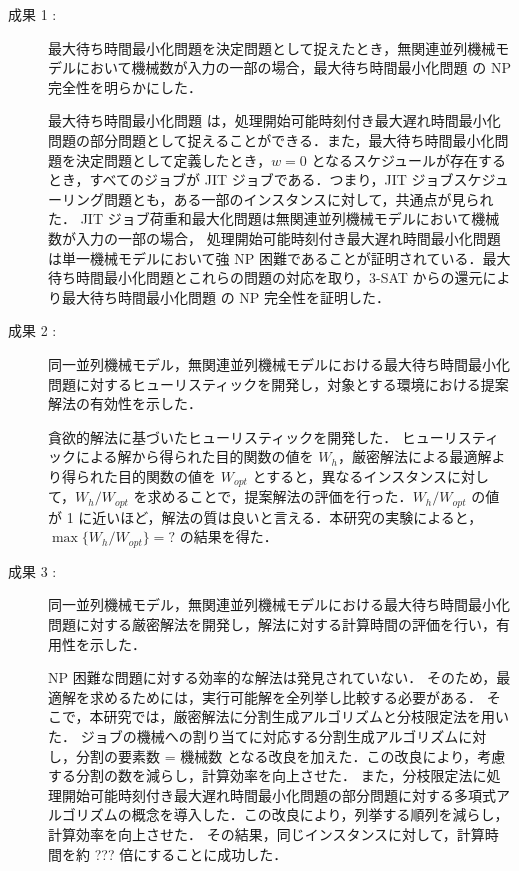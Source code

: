 \documentclass[12pt]{optlab-bachelor}
\begin{document}
\begin{description}
  \item[成果 1 :]
  最大待ち時間最小化問題を決定問題として捉えたとき，無関連並列機械モデルにおいて機械数が入力の一部の場合，最大待ち時間最小化問題 の NP 完全性を明らかにした．

  最大待ち時間最小化問題 は，処理開始可能時刻付き最大遅れ時間最小化問題の部分問題として捉えることができる．また，最大待ち時間最小化問題を決定問題として定義したとき，$w = 0$ となるスケジュールが存在するとき，すべてのジョブが JIT ジョブである．つまり，JIT ジョブスケジューリング問題とも，ある一部のインスタンスに対して，共通点が見られた．
  JIT ジョブ荷重和最大化問題は無関連並列機械モデルにおいて機械数が入力の一部の場合， 処理開始可能時刻付き最大遅れ時間最小化問題は単一機械モデルにおいて強 NP 困難であることが証明されている．最大待ち時間最小化問題とこれらの問題の対応を取り，\textsc{3-SAT} からの還元により最大待ち時間最小化問題 の NP 完全性を証明した．

  \item[成果 2 :]
  同一並列機械モデル，無関連並列機械モデルにおける最大待ち時間最小化問題に対するヒューリスティックを開発し，対象とする環境における提案解法の有効性を示した．

  貪欲的解法に基づいたヒューリスティックを開発した．
  ヒューリスティックによる解から得られた目的関数の値を $W_h$，厳密解法による最適解より得られた目的関数の値を $W_{opt}$ とすると，異なるインスタンスに対して，$W_h/W_{opt}$ を求めることで，提案解法の評価を行った．$W_h/W_{opt}$ の値が 1 に近いほど，解法の質は良いと言える．本研究の実験によると，$\max\big\{W_h/W_{opt}\big\} = ?$ の結果を得た．

  \item[成果 3 :]
  同一並列機械モデル，無関連並列機械モデルにおける最大待ち時間最小化問題に対する厳密解法を開発し，解法に対する計算時間の評価を行い，有用性を示した．

  NP 困難な問題に対する効率的な解法は発見されていない．
  そのため，最適解を求めるためには，実行可能解を全列挙し比較する必要がある．
  そこで，本研究では，厳密解法に分割生成アルゴリズムと分枝限定法を用いた．
  ジョブの機械への割り当てに対応する分割生成アルゴリズムに対し，分割の要素数 = 機械数 となる改良を加えた．この改良により，考慮する分割の数を減らし，計算効率を向上させた．
  また，分枝限定法に処理開始可能時刻付き最大遅れ時間最小化問題の部分問題に対する多項式アルゴリズムの概念を導入した．この改良により，列挙する順列を減らし，計算効率を向上させた．
  その結果，同じインスタンスに対して，計算時間を約 ??? 倍にすることに成功した．

\end{description}
\end{document}
